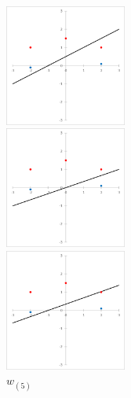 \begin{figure}[H]
    \begin{minipage}{0.3\hsize}
        \begin{center}
            \includegraphics[width=40mm]{./figures/section_2/image3.eps}
            \captionsetup{labelformat=empty,labelsep=none}
            \caption{$w_{(3)}$}
        \end{center}
    \end{minipage}
    \begin{minipage}{0.3\hsize}
        \begin{center}
            \includegraphics[width=40mm]{./figures/section_2/image4.eps}
            \captionsetup{labelformat=empty,labelsep=none}
            \caption{$w_{(4)}$}
        \end{center}
    \end{minipage}
    \begin{minipage}{0.3\hsize}
        \begin{center}
            \includegraphics[width=40mm]{./figures/section_2/image5.eps}
            \captionsetup{labelformat=empty,labelsep=none}
            \caption{$w_{(5)}$}
        \end{center}
    \end{minipage}
\end{figure}

